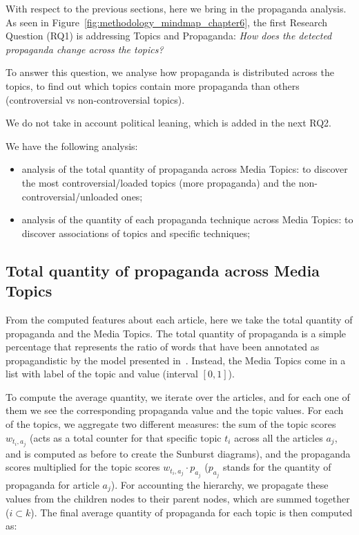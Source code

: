 With respect to the previous sections, here we bring in the propaganda analysis. As seen in Figure~\ref{fig:methodology_mindmap_chapter6}, the first Research Question (RQ1) is addressing Topics and Propaganda:
\emph{How does the detected propaganda change across the topics?}

To answer this question, we analyse how propaganda is distributed across the topics, to find out which topics contain more propaganda than others (controversial vs non-controversial topics).

We do not take in account political leaning, which is added in the next RQ2.

We have the following analysis:

\begin{itemize}
    \item analysis of the total quantity of propaganda across Media Topics: to discover the most controversial/loaded topics (more propaganda) and the non-controversial/unloaded ones;
    \item analysis of the quantity of each propaganda technique across Media Topics: to discover associations of topics and specific techniques;
\end{itemize}

\subsection{Total quantity of propaganda across Media Topics}
\label{sec:topic_propaganda_tot}

From the computed features about each article, here we take the total quantity of propaganda and the Media Topics.
The total quantity of propaganda is a simple percentage that represents the ratio of words that have been annotated as propagandistic by the model presented in~\citet{da2019fine}.
Instead, the Media Topics come in a list with label of the topic and value (interval $[0,1]$).

To compute the average quantity, we iterate over the articles, and for each one of them we see the corresponding propaganda value and the topic values. For each of the topics, we aggregate two different measures: the sum of the topic scores $w_{t_{i},a_{j}}$ (acts as a total counter for that specific topic $t_{i}$ across all the articles $a_{j}$, and is computed as before to create the Sunburst diagrams), and the propaganda scores multiplied for the topic scores $w_{t_{i},a_{j}} \cdot p_{a_{j}}$ ($p_{a_{j}}$ stands for the quantity of propaganda for article $a_{j}$).
For accounting the hierarchy, we propagate these values from the children nodes to their parent nodes, which are summed together ($i\subset k$).
The final average quantity of propaganda for each topic is then computed as:

